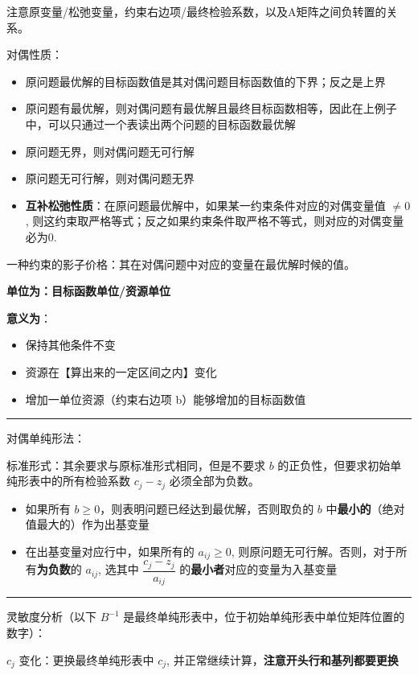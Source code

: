 \documentclass[UTF8, 6pt]{ctexart}
\newcommand{\mcompress}{\vspace{-10 px}}
\newcommand{\sectionline}{\rule[2pt]{0.45\textwidth}{0.05em}}
\begin{document}
\mcompress

注意原变量/松弛变量，约束右边项/最终检验系数，以及A矩阵之间负转置的关系。

对偶性质：
\begin{itemize}
	\item 原问题最优解的目标函数值是其对偶问题目标函数值的下界；反之是上界
	\item 原问题有最优解，则对偶问题有最优解且最终目标函数相等，因此在上例子中，可以只通过一个表读出两个问题的目标函数最优解
	\item 原问题无界，则对偶问题无可行解
	\item 原问题无可行解，则对偶问题无界
	\item \textbf{互补松弛性质}：在原问题最优解中，如果某一约束条件对应的对偶变量值 $\neq 0$, 则这约束取严格等式；反之如果约束条件取严格不等式，则对应的对偶变量必为0.
\end{itemize}

一种约束的影子价格：其在对偶问题中对应的变量在最优解时候的值。

\textbf{单位为：目标函数单位/资源单位}

\textbf{意义为}：

\begin{itemize}
	\item 保持其他条件不变
	\item 资源在【算出来的一定区间之内】变化
	\item 增加一单位资源（约束右边项 b）能够增加的目标函数值
\end{itemize}

\sectionline

对偶单纯形法：

标准形式：其余要求与原标准形式相同，但是不要求 $b$ 的正负性，但要求初始单纯形表中的所有检验系数 $c_j-z_j$ 必须全部为负数。

\begin{itemize}
	\item 如果所有 $b\geq 0$，则表明问题已经达到最优解，否则取负的 $b$ 中\textbf{最小的}（绝对值最大的）作为出基变量
	\item 在出基变量对应行中，如果所有的 $a_{ij} \geq 0$, 则原问题无可行解。否则，对于所有\textbf{为负数}的 $a_{ij}$, 选其中 $\dfrac{c_j-z_j}{a_{ij}}$ 的\textbf{最小者}对应的变量为入基变量
\end{itemize}

\sectionline

\noindent
灵敏度分析（以下 $B^{-1}$ 是最终单纯形表中，位于初始单纯形表中单位矩阵位置的数字）：

$c_j$ 变化：更换最终单纯形表中 $c_j$, 并正常继续计算，\textbf{注意开头行和基列都要更换}
\end{document}
